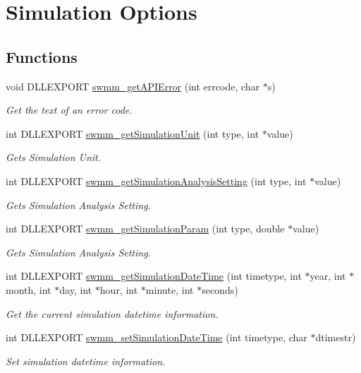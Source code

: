 \hypertarget{group___simulation_settings}{}\section{Simulation Options}
\label{group___simulation_settings}
\subsection*{Functions}
\begin{DoxyCompactItemize}
\item 
void D\+L\+L\+E\+X\+P\+O\+RT \hyperlink{group___simulation_settings_gad0599614140f8c3edb3e44fa4ce6914b}{swmm\+\_\+get\+A\+P\+I\+Error} (int errcode, char $\ast$s)
\begin{DoxyCompactList}\small\item\em Get the text of an error code. \end{DoxyCompactList}\item 
int D\+L\+L\+E\+X\+P\+O\+RT \hyperlink{group___simulation_settings_ga2c45b28a68a6661f55dd108d0ee22950}{swmm\+\_\+get\+Simulation\+Unit} (int type, int $\ast$value)
\begin{DoxyCompactList}\small\item\em Gets Simulation Unit. \end{DoxyCompactList}\item 
int D\+L\+L\+E\+X\+P\+O\+RT \hyperlink{group___simulation_settings_ga9ec64a873071a584734f8202582dbe2c}{swmm\+\_\+get\+Simulation\+Analysis\+Setting} (int type, int $\ast$value)
\begin{DoxyCompactList}\small\item\em Gets Simulation Analysis Setting. \end{DoxyCompactList}\item 
int D\+L\+L\+E\+X\+P\+O\+RT \hyperlink{group___simulation_settings_ga3f3a35c715f9d618efabb85bed6e2d08}{swmm\+\_\+get\+Simulation\+Param} (int type, double $\ast$value)
\begin{DoxyCompactList}\small\item\em Gets Simulation Analysis Setting. \end{DoxyCompactList}\item 
int D\+L\+L\+E\+X\+P\+O\+RT \hyperlink{group___simulation_settings_gaccc662920215c153b43181055c1f3c8f}{swmm\+\_\+get\+Simulation\+Date\+Time} (int timetype, int $\ast$year, int $\ast$month, int $\ast$day, int $\ast$hour, int $\ast$minute, int $\ast$seconds)
\begin{DoxyCompactList}\small\item\em Get the current simulation datetime information. \end{DoxyCompactList}\item 
int D\+L\+L\+E\+X\+P\+O\+RT \hyperlink{group___simulation_settings_ga2539c5004593b674f972e757828a0759}{swmm\+\_\+set\+Simulation\+Date\+Time} (int timetype, char $\ast$dtimestr)
\begin{DoxyCompactList}\small\item\em Set simulation datetime information. \end{DoxyCompactList}\end{DoxyCompactItemize}



